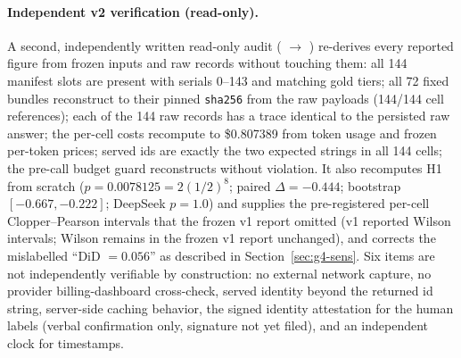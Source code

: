 \paragraph{Independent v2 verification (read-only).}
A second, independently written read-only audit
( $\to$
) re-derives every reported figure
from frozen inputs and raw records without touching them: all 144 manifest
slots are present with serials 0--143 and matching gold tiers; all 72 fixed
bundles reconstruct to their pinned \texttt{sha256} from the raw payloads
(144/144 cell references); each of the 144 raw records has a trace identical
to the persisted raw answer; the per-cell costs recompute to
\$0.807389 from token usage and frozen per-token prices; served ids are
exactly the two expected strings in all 144 cells; the pre-call budget guard
reconstructs without violation. It also recomputes H1 from scratch
($p=0.0078125=2(1/2)^8$; paired $\Delta=-0.444$; bootstrap $[-0.667,-0.222]$;
DeepSeek $p=1.0$) and supplies the pre-registered per-cell
Clopper--Pearson intervals that the frozen v1 report omitted (v1 reported
Wilson intervals; Wilson remains in the frozen v1 report unchanged), and
corrects the mislabelled ``DiD $=0.056$'' as described in
Section~\ref{sec:g4-sens}. Six items are not independently verifiable by
construction: no external network capture, no provider billing-dashboard
cross-check, served identity beyond the returned id string, server-side
caching behavior, the signed identity attestation for the human labels
(verbal confirmation only, signature not yet filed), and an
independent clock for timestamps.

